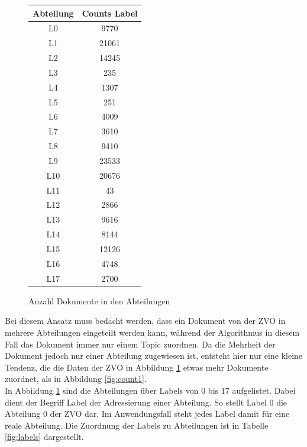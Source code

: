 \documentclass[german,version-2020-11]{uzl-thesis}
\begin{document}
\begin{figure}[H]
\begin{center}
\begin{tabular}{cc}
\hline
\hline
Abteilung & Counts Label\\
\hline
L0&9770\\
L1&21061\\
L2&14245\\
L3&235\\
L4&1307\\
L5&251\\
L6&4009\\
L7&3610\\
L8&9410\\
L9&23533\\
L10&20676\\
L11&43\\
L12&2866\\
L13&9616\\
L14&8144\\
L15&12126\\
L16&4748\\
L17&2700\\
\hline
\hline
\end{tabular}
\caption{Anzahl Dokumente in den Abteilungen}
\label{fig:count2}
\end{center}
\end{figure}

Bei diesem Ansatz muss bedacht werden, dass ein Dokument von der ZVO in mehrere Abteilungen eingeteilt werden kann, während der Algorithmus in diesem Fall das Dokument immer nur einem Topic zuordnen. Da die Mehrheit der Dokument jedoch nur einer Abteilung zugewiesen ist, entsteht hier nur eine kleine Tendenz, die die Daten der ZVO in Abbildung \ref{fig:count2} etwas mehr Dokumente zuordnet, als in Abbildung \ref{fig:count1}.\\

In Abbildung \ref{fig:count2} sind die Abteilungen über Labels von $0$ bis $17$ aufgelistet. Dabei dient der Begriff Label der Adressierung einer Abteilung. So stellt Label 0 die Abteilung 0 der ZVO dar. Im Anwendungsfall steht jedes Label damit für eine reale Abteilung. Die Zuordnung der Labels zu Abteilungen ist in Tabelle \ref{fig:labels} dargestellt.
\end{document}
